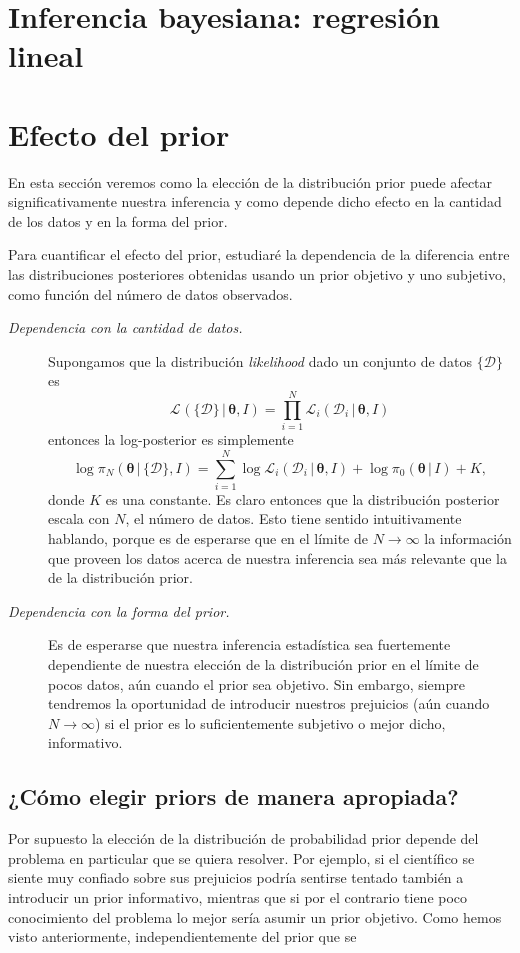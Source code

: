 \documentclass[a4paper,twoside]{article}
\newcommand{\br}{\ensuremath{\,|\,}\xspace}
\newcommand{\hip}{\ensuremath{\mathbold{\theta}}\xspace}
\newcommand{\dat}{\ensuremath{\{\mathcal{D}\}}\xspace}
\newcommand{\pos}[2]{\ensuremath{\pi_N\left(#1\br #2\right)}\xspace}
\newcommand{\pri}[2]{\ensuremath{\pi_0\left(#1\br #2\right)}\xspace}
\newcommand{\lik}[3][]{\ensuremath{\mathcal{L}_{#1}\left(#2\br #3\right)}\xspace}
\begin{document}
\section{Inferencia bayesiana: regresión lineal}


\section{Efecto del prior}
%
En esta sección veremos como la elección de la distribución prior puede afectar significativamente
nuestra inferencia y como depende dicho efecto en la cantidad de los datos y en la forma del prior.

Para cuantificar el efecto del prior, estudiaré la dependencia de la diferencia entre las
distribuciones posteriores obtenidas usando un prior objetivo y uno subjetivo, como función del
número de datos observados.

\begin{description}
%
\item[\textit{\color{teal} Dependencia con la cantidad de datos.}] Supongamos que la distribución
\emph{likelihood} dado un conjunto de datos \(\dat\) es
%
\[\lik{\dat}{\hip,I} = \prod_{i=1}^N\lik[i]{\mathcal{D}_i}{\hip,I}\]
%
entonces la log-posterior es simplemente
%
\[\log{\pos{\hip}{\dat,I}} = \sum_{i=1}^N\log{\lik[i]{\mathcal{D}_i}{\hip,I}} + \log{\pri{\hip}{I}} + K,\]
%
donde \(K\) es una constante. Es claro entonces que la distribución posterior escala con \(N\), el
número de datos. Esto tiene sentido intuitivamente hablando, porque es de esperarse que en el límite
de \(N\to\infty\) la información que proveen los datos acerca de nuestra inferencia sea más
relevante que la de la distribución prior.
%
\item[\textit{\color{teal} Dependencia con la forma del prior.}] Es de esperarse que nuestra
inferencia estadística sea fuertemente dependiente de nuestra elección de la distribución prior en
el límite de pocos datos, aún cuando el prior sea objetivo. Sin embargo, siempre tendremos la
oportunidad de introducir nuestros prejuicios (aún cuando \(N\to\infty\)) si el prior es lo
suficientemente subjetivo o mejor dicho, informativo.
%
\end{description}

\subsection*{¿Cómo elegir priors de manera apropiada?}
%
Por supuesto la elección de la distribución de probabilidad prior depende del problema en particular
que se quiera resolver. Por ejemplo, si el científico se siente muy confiado sobre sus prejuicios
podría sentirse tentado también a introducir un prior informativo, mientras que si por el contrario
tiene poco conocimiento del problema lo mejor sería asumir un prior objetivo. Como hemos visto
anteriormente, independientemente del prior que se
\end{document}
